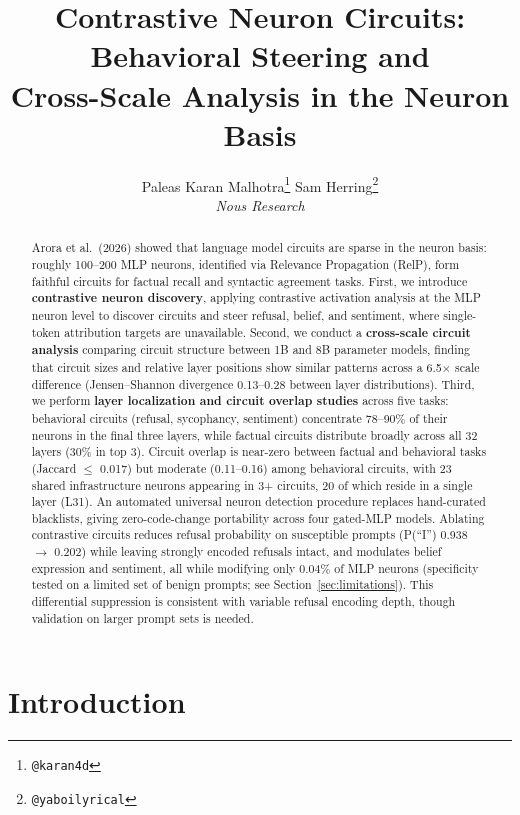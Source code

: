 \documentclass[11pt]{article}
\title{Contrastive Neuron Circuits: Behavioral Steering and \\ Cross-Scale Analysis in the Neuron Basis}
\author{%
  Paleas
  \quad
  Karan Malhotra\thanks{\texttt{@karan4d}}
  \quad
  Sam Herring\thanks{\texttt{@yaboilyrical}} \\[6pt]
  \textit{Nous Research}
}
\begin{document}
\maketitle

\begin{abstract}
Arora et al.\ (2026) showed that language model circuits are sparse in the neuron basis: roughly 100--200 MLP neurons, identified via Relevance Propagation (RelP), form faithful circuits for factual recall and syntactic agreement tasks.
First, we introduce \textbf{contrastive neuron discovery}, applying contrastive activation analysis at the MLP neuron level to discover circuits and steer refusal, belief, and sentiment, where single-token attribution targets are unavailable.
Second, we conduct a \textbf{cross-scale circuit analysis} comparing circuit structure between 1B and 8B parameter models, finding that circuit sizes and relative layer positions show similar patterns across a 6.5$\times$ scale difference (Jensen--Shannon divergence 0.13--0.28 between layer distributions).
Third, we perform \textbf{layer localization and circuit overlap studies} across five tasks: behavioral circuits (refusal, sycophancy, sentiment) concentrate 78--90\% of their neurons in the final three layers, while factual circuits distribute broadly across all 32 layers (30\% in top 3).
Circuit overlap is near-zero between factual and behavioral tasks (Jaccard $\leq$ 0.017) but moderate (0.11--0.16) among behavioral circuits, with 23 shared infrastructure neurons appearing in 3+ circuits, 20 of which reside in a single layer (L31).
An automated universal neuron detection procedure replaces hand-curated blacklists, giving zero-code-change portability across four gated-MLP models.
Ablating contrastive circuits reduces refusal probability on susceptible prompts (P(``I'') 0.938 $\to$ 0.202) while leaving strongly encoded refusals intact, and modulates belief expression and sentiment, all while modifying only 0.04\% of MLP neurons (specificity tested on a limited set of benign prompts; see Section~\ref{sec:limitations}).
This differential suppression is consistent with variable refusal encoding depth, though validation on larger prompt sets is needed.
\end{abstract}


\section{Introduction}
\label{sec:intro}
\end{document}
